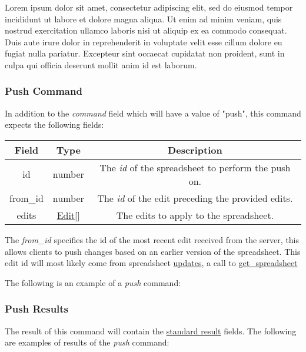 Lorem ipsum dolor sit amet, consectetur adipiscing elit, sed do eiusmod tempor incididunt ut labore et dolore magna aliqua. Ut enim ad minim veniam, quis nostrud exercitation ullamco laboris nisi ut aliquip ex ea commodo consequat. Duis aute irure dolor in reprehenderit in voluptate velit esse cillum dolore eu fugiat nulla pariatur. Excepteur sint occaecat cupidatat non proident, sunt in culpa qui officia deserunt mollit anim id est laborum.

\subsubsection{Push Command}
In addition to the \emph{command} field which will have a value of "push", this command expects the following fields:
\begin{table}[H]
    \begin{center}
        \begin{tabular}{|c|c|c|}\hline
            Field & Type & Description \\\hline
            id & number & The \emph{id} of the spreadsheet to perform the push on. \\\hline
            from\_id & number & The \emph{id} of the edit preceding the provided edits. \\\hline
            edits & \hyperref[sec:message:edits]{Edit}[] & The edits to apply to the spreadsheet. \\\hline
        \end{tabular}
    \end{center}
\end{table}
The \emph{from\_id} specifies the id of the most recent edit received from the server, this allows clients to push changes
based on an earlier version of the spreadsheet. This edit id will most likely come from spreadsheet \hyperref[lst:update:edits]{updates},
a call to \hyperref[sec:message:get_spreadsheet]{get\_spreadsheet}

The following is an example of a \emph{push} command:


\subsubsection{Push Results}
The result of this command will contain the \hyperref[sec:message:result]{standard result} fields.
The following are examples of results of the \emph{push} command:




